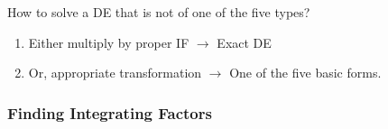 How to solve a DE that is not of one of the five types?
\begin{enumerate}
    \item Either multiply by proper IF $ \to $ Exact DE
    \item Or, appropriate transformation $ \to $ One of the five basic forms.
\end{enumerate}


\subsubsection{Finding Integrating Factors}









